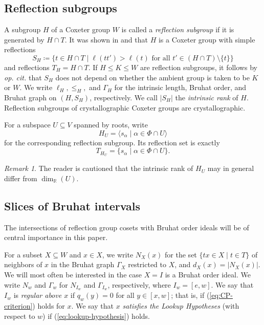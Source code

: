 \documentclass[11pt]{amsart}
\theoremstyle{definition}
\theoremstyle{remark}
\newtheorem{remark}[remark]{Remark}
\numberwithin{equation}{section}
\newcommand{\R}{\mathbb R}
\begin{document}
\subsection{Reflection subgroups}\label{sec:intrinsic}

A subgroup $H$ of a Coxeter group $W$ is called a \emph{reflection subgroup} if it is generated by $H \cap T$. It was shown in \cite{DeodharSub} and \cite[Thm.~1.8]{DyerThesis} that $H$ is a Coxeter group with simple reflections
\begin{equation*}%
 S_H \coloneqq \{t\in H\cap T \mid \ell(tt')>\ell(t) \text{ for all } t' \in (H\cap T) \setminus \{t\}\}
\end{equation*}
and reflections $T_H=H\cap T$. If $H \leq K \leq W$ are reflection subgroups, it follows by \emph{op. cit.} that $S_H$ does not depend on whether the ambient group is taken to be $K$ or $W$. We write $\ell_H,\le_H,$ and $\Gamma_H$ for the intrinsic length, Bruhat order, and Bruhat graph on $(H,S_H)$, respectively. We call $\lvert S_H\rvert$ the \emph{intrinsic rank} of $H$. Reflection subgroups of crystallographic Coxeter groups are crystallographic. 

For a subspace $U\subseteq V$ spanned by roots, write
\begin{equation}\label{eq:root-subgroup}
 H_U=\langle s_\alpha \mid \alpha\in\Phi\cap U\rangle
\end{equation}
for the corresponding reflection subgroup. Its reflection set is exactly
\begin{equation}\label{eq:root-reflections}
 T_{H_U}=\{s_\alpha \mid \alpha\in\Phi\cap U\}.
\end{equation}

\begin{remark}
    The reader is cautioned that the intrinsic rank of $H_U$ may in general differ from $\dim_\R(U)$. 
\end{remark}

\subsection{Slices of Bruhat intervals} The intersections of reflection group cosets with Bruhat order ideals will be of central importance in this paper. 

For a subset $X\subseteq W$ and $x \in X$, we write $N_X(x)$ for the set $\{tx\in X \mid t\in T\}$ of neighbors of $x$ in the Bruhat graph $\Gamma_X$ restricted to $X$, and $d_X(x)=\lvert N_X(x)\rvert$. 
We will most often be interested in the case $X=I$ is a Bruhat order ideal. We write $N_w$ and $\Gamma_w$ for $N_{I_w}$ and $\Gamma_{I_w}$, respectively, where $I_w=[e,w]$. We say that $I_w$ is \emph{regular above $x$} if $q_w(y)=0$ for
all $y\in[x,w]$; that is, if (\ref{eq:CP-criterion}) holds for $x$. We say that $x$ \emph{satisfies the Lookup
Hypotheses} (with respect to $w$) if (\ref{eq:lookup-hypothesis}) holds.
\end{document}
